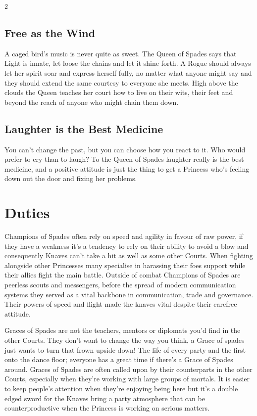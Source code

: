 \begin{multicols}{2}
\subsection*{Free as the Wind}

A caged bird's music is never quite as sweet. The Queen of Spades says that Light is innate, let loose the chains and let it shine forth. A Rogue should always let her spirit soar and express herself fully, no matter what anyone might say and they should extend the same courtesy to everyone she meets. High above the clouds the Queen teaches her court how to live on their wits, their feet and beyond the reach of anyone who might chain them down. 

\subsection*{Laughter is the Best Medicine}

You can't change the past, but you can choose how you react to it. Who would prefer to cry than to laugh? To the Queen of Spades laughter really is the best medicine, and a positive attitude is just the thing to get a Princess who's feeling down out the door and fixing her problems. 

\section*{Duties}

Champions of Spades often rely on speed and agility in favour of raw power, if they have a weakness it's a tendency to rely on their ability to avoid a blow and consequently Knaves can't take a hit as well as some other Courts. When fighting alongside other Princesses many specialise in harassing their foes support while their allies fight the main battle. Outside of combat Champions of Spades are peerless scouts and messengers, before the spread of modern communication systems they served as a vital backbone in communication, trade and governance. Their powers of speed and flight made the knaves vital despite their carefree attitude.

Graces of Spades are not the teachers, mentors or diplomats you'd find in the other Courts. They don't want to change the way you think, a Grace of spades just wants to turn that frown upside down! The life of every party and the first onto the dance floor; everyone has a great time if there's a Grace of Spades around. Graces of Spades are often called upon by their counterparts in the other Courts, especially when they're working with large groups of mortals. It is easier to keep people's attention when they're enjoying being here but it's a double edged sword for the Knaves bring a party atmosphere that can be counterproductive when the Princess is working on serious matters.


\end{multicols}
